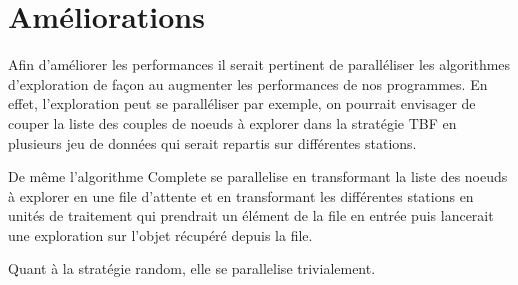 \section{Améliorations}

Afin d'améliorer les performances il serait pertinent
de paralléliser les algorithmes d'exploration de façon au augmenter les performances
de nos programmes. En effet, l'exploration peut se paralléliser par exemple, on pourrait
envisager de couper la liste des couples de noeuds à explorer dans la stratégie TBF en
plusieurs jeu de données qui serait repartis sur différentes stations.

De même l'algorithme Complete se parallelise en transformant la liste des noeuds à explorer
en une file d'attente et en transformant les différentes stations en unités de traitement qui prendrait
un élément de la file en entrée puis lancerait une exploration sur l'objet récupéré depuis la file.

Quant à la stratégie random, elle se parallelise trivialement.
